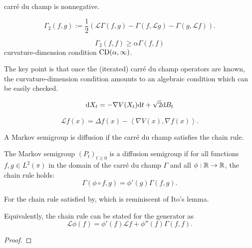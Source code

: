 carr\'e du champ is nonnegative.

\begin{proposition}
    
\end{proposition}

\begin{definition}
    \begin{equation*}
        \Gamma_2(f,g):=\frac{1}{2}(\mathscr{L}\Gamma(f,g)-\Gamma(f,\mathscr{L}g)-\Gamma(g,\mathscr{L}f)).
    \end{equation*}
\end{definition}

\begin{definition}
    \begin{equation*}
        \Gamma_2(f,f)\geq \alpha \Gamma(f,f)
    \end{equation*}
    curvature-dimension condition $\textnormal{CD}(\alpha,\infty)$.
\end{definition}

The key point is that once the (iterated) carr\'e du champ operators are known, the curvature-dimension condition amounts to an algebraic condition which can be easily checked.


\begin{example}
    \begin{equation}\label{eq:langevin diffusion}
        \mathrm{d} X_t=-\nabla V(X_t)\mathrm{d} t+\sqrt{2}\mathrm{d} B_t
    \end{equation}

    \begin{equation*}
        \mathscr{L}f(x)=\Delta f(x)-\left\langle \nabla V(x),\nabla f(x)\right\rangle.
    \end{equation*}
\end{example}
A Markov semigroup is diffusion if the carr\'e du champ satisfies the chain rule.
\begin{definition}
    The Markov semigroup $(P_t)_{t\geq 0}$ is a diffusion semigroup if for all functions $f,g\in L^2(\pi)$ in the domain of the carr\'e du champ $\Gamma$ and all $\phi:\mathbb{R}\to\mathbb{R}$,
    the chain rule holds:
    \begin{equation}\label{eq:diffusion_semigroup_chain_rule}
        \Gamma(\phi\circ f,g)=\phi'(g)\Gamma(f,g).
    \end{equation}
\end{definition}

For the chain rule satisfied by, which is reminiscent of Ito's lemma.
\begin{proposition}
    Equivalently, the chain rule can be stated for the generator as 
    \begin{equation*}
        \mathscr{L}\phi(f)=\phi'(f)\mathscr{L}f+\phi''(f)\Gamma(f,f).
    \end{equation*}
\end{proposition}
\begin{proof}
    
\end{proof}

